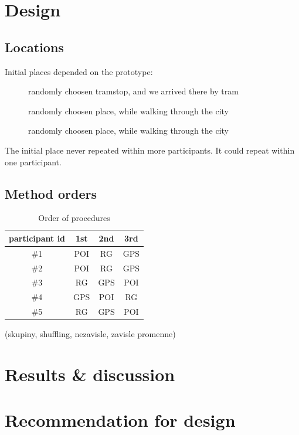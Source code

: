 \documentclass[11pt,twoside,a4paper]{book}
\begin{document}
	\section{Design}
	\subsection{Locations}
	Initial places depended on the prototype:
	\begin{description}
		\item [\poi{}] randomly choosen tramstop, and we arrived there by tram
		\item [\reversegeo{}] randomly choosen place, while walking through the city
		\item [\gps{}] randomly choosen place, while walking through the city
	\end{description}
	
	The initial place never repeated within more participants. It could repeat within one participant.
	\subsection{Method orders}
	\begin{table}[]
		\centering
		\caption{Order of procedures}
		\label{my-label}
		\begin{tabular}{@{}cccc@{}}
			\toprule
			\textbf{participant id} & \textbf{1st} & \textbf{2nd} & \textbf{3rd} \\ \midrule
			\#1                     & POI          & RG           & GPS          \\
			\#2                     & POI          & RG           & GPS          \\
			\#3                     & RG           & GPS          & POI          \\
			\#4                     & GPS          & POI          & RG           \\
			\#5                     & RG           & GPS          & POI          \\ \bottomrule
		\end{tabular}
	\end{table}
	
	(skupiny, shuffling, nezavisle, zavisle promenne)
	\section{Results \& discussion}
	\section{Recommendation for design}
	
\end{document}
